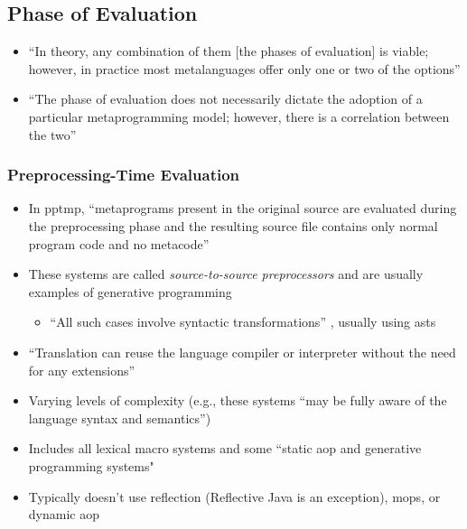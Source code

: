 \subsection{Phase of Evaluation}
\begin{itemize}
      \item ``In theory, any combination of them [the phases of evaluation] is
            viable; however, in practice most metalanguages offer only one or
            two of the options'' \cite[p.~113:20]{lilis_survey_2019}
      \item ``The phase of evaluation does not necessarily dictate the adoption
            of a particular metaprogramming model; however, there is a
            correlation between the two'' \cite[p.~113:20]{lilis_survey_2019}
\end{itemize}

\subsubsection{Preprocessing-Time Evaluation \cite[p.~113:20-21]{lilis_survey_2019}}
\begin{itemize}
      \item In \acf{pptmp}, ``metaprograms present in the original source are
            evaluated during the preprocessing phase and the resulting source
            file contains only normal program code and no metacode''
            \cite[p.~113:20]{lilis_survey_2019}
      \item These systems are called \emph{source-to-source preprocessors}
            \cite[p.~113:20]{lilis_survey_2019} and are usually examples of
            generative programming \cite[p.~113:21]{lilis_survey_2019}
            \begin{itemize}
                  \item ``All such cases involve syntactic transformations''
                        \cite[p.~113:21]{lilis_survey_2019}, usually using
                        \acsp{ast}
            \end{itemize}
      \item ``Translation can reuse the language compiler or interpreter
            without the need for any extensions'' \cite[p.~113:20]{lilis_survey_2019}
      \item Varying levels of complexity (e.g., these systems ``may be fully
            aware of the language syntax and semantics'')
            \cite[p.~113:20]{lilis_survey_2019}
      \item Includes all lexical macro systems \cite[p.~113:20]{lilis_survey_2019}
            and some ``static \acs{aop} and generative programming systems"
            \cite[p.~113:31]{lilis_survey_2019}
      \item Typically doesn't use reflection (Reflective Java is an exception),
            \acsp{mop}, or dynamic \acs{aop} \cite[p.~113:21]{lilis_survey_2019}
\end{itemize}

